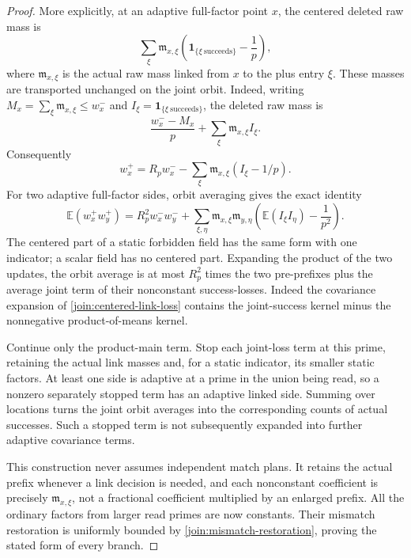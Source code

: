 \begin{proof}
More explicitly, at an adaptive full-factor point $x$, the centered
deleted raw mass is
\begin{equation}\label{join:centered-link-loss}
 \sum_{\xi}\mathfrak m_{x,\xi}
 \left(\mathbf 1_{\{\xi\ \mathrm{succeeds}\}}-\frac1p\right),
\end{equation}
where $\mathfrak m_{x,\xi}$ is the actual raw mass linked from $x$ to
the plus entry $\xi$. These masses are transported unchanged on the
joint orbit. Indeed, writing
$M_x=\sum_\xi\mathfrak m_{x,\xi}\le w_x^-$ and
$I_\xi=\mathbf1_{\{\xi\ \mathrm{succeeds}\}}$, the deleted raw mass is
\[
 \frac{w_x^--M_x}{p}+\sum_\xi\mathfrak m_{x,\xi}I_\xi.
\]
Consequently
\[
 w_x^+=R_pw_x^-
       -\sum_\xi\mathfrak m_{x,\xi}(I_\xi-1/p).
\]
For two adaptive full-factor sides, orbit averaging gives the exact
identity
\begin{equation}\label{join:raw-covariance}
 \mathbb E(w_x^+w_y^+)
 =R_p^2w_x^-w_y^-
 +\sum_{\xi,\eta}\mathfrak m_{x,\xi}\mathfrak m_{y,\eta}
       \left(\mathbb E(I_\xi I_\eta)-\frac1{p^2}\right).
\end{equation}
The centered part of a static forbidden field has the
same form with one indicator; a scalar field has no centered part.
Expanding the product of the two updates, the orbit average is at most
$R_p^2$ times the two pre-prefixes plus the average joint term of their
nonconstant success-losses. Indeed the covariance expansion of
\eqref{join:centered-link-loss} contains the joint-success kernel minus
the nonnegative product-of-means kernel.

Continue only the product-main term. Stop each joint-loss term at
this prime, retaining the actual link masses and, for a static
indicator, its smaller static factors. At least one side is adaptive
at a prime in the union being read, so a nonzero separately stopped
term has an adaptive linked side. Summing over locations turns the
joint orbit averages into the corresponding counts of actual
successes. Such a stopped term is not subsequently expanded into
further adaptive covariance terms.

This construction never assumes independent match plans. It retains
the actual prefix whenever a link decision is needed, and each
nonconstant coefficient is precisely $\mathfrak m_{x,\xi}$, not a
fractional coefficient multiplied by an enlarged prefix. All the
ordinary factors from larger read primes are now constants. Their
mismatch restoration is uniformly bounded by
\eqref{join:mismatch-restoration}, proving the stated form of every
branch.
\end{proof}

